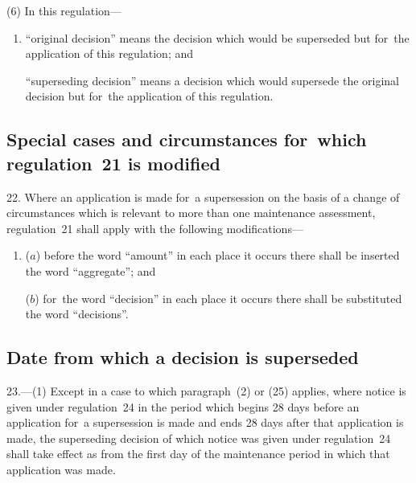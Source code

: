 \documentclass[a4paper,12pt]{article}
\begin{document}
(6) In this regulation---
\begin{enumerate}\item[]
“original decision” means the decision which would be superseded but for~the application of this regulation; and

“superseding decision” means a decision which would supersede the original decision but for~the application of this regulation.
\end{enumerate}


\subsection[22. Special cases and circumstances for~which regulation~21 is modified]{Special cases and circumstances for~which regulation~21 is modified}

22.  Where an application is made for~a supersession on the basis of a change of circumstances which is relevant to more than one maintenance assessment, regulation~21 shall apply with the following modifications---
\begin{enumerate}\item[]
($a$) before the word “amount” in each place it occurs there shall be inserted the word “aggregate”; and

($b$) for~the word “decision” in each place it occurs there shall be substituted the word “decisions”.
\end{enumerate}

\subsection[23. Date from which a decision is superseded]{Date from which a decision is superseded}

23.—(1) Except in a case to which paragraph~(2) 
or (25)  %
applies, where notice is given under regulation~24 in the period which begins 28 days before an application for~a supersession is made and ends 28 days after that application is made, the superseding decision of which notice was given under regulation~24 shall take effect as from the first day of the maintenance period in which that application was made.

\end{document}

